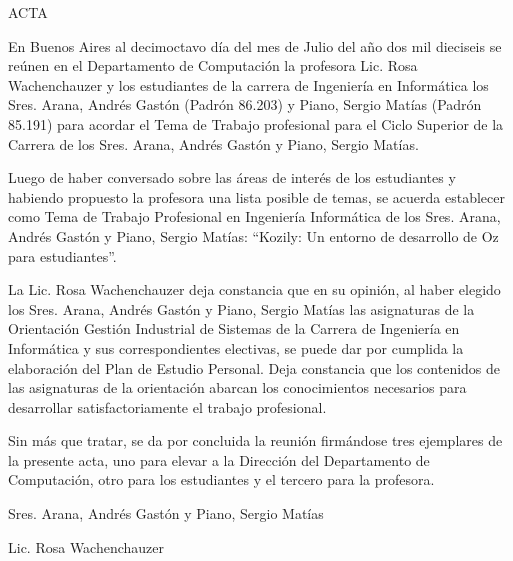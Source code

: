\documentclass[a4paper,11pt]{article}
\begin{document}
\begin{center}
ACTA
\end{center}

En Buenos Aires al decimoctavo día del mes de Julio del año dos mil dieciseis
se reúnen en el Departamento de Computación la profesora Lic. Rosa
Wachenchauzer y los estudiantes de la carrera de Ingeniería en Informática los
Sres. Arana, Andrés Gastón (Padrón 86.203) y Piano, Sergio Matías (Padrón
85.191) para acordar el Tema de Trabajo profesional para el Ciclo Superior de
la Carrera de los Sres. Arana, Andrés Gastón y Piano, Sergio Matías.

Luego de haber conversado sobre las áreas de interés de los estudiantes y
habiendo propuesto la profesora una lista posible de temas, se acuerda
establecer como Tema de Trabajo Profesional en Ingeniería Informática de los
Sres. Arana, Andrés Gastón y Piano, Sergio Matías: “Kozily: Un entorno de
desarrollo de Oz para estudiantes”.

La Lic. Rosa Wachenchauzer deja constancia que en su opinión, al haber elegido
los Sres. Arana, Andrés Gastón y Piano, Sergio Matías las asignaturas de la
Orientación Gestión Industrial de Sistemas de la Carrera de Ingeniería en
Informática y sus correspondientes electivas, se puede dar por cumplida la
elaboración del Plan de Estudio Personal. Deja constancia que los contenidos de
las asignaturas de la orientación abarcan los conocimientos necesarios para
desarrollar satisfactoriamente el trabajo profesional.

Sin más que tratar, se da por concluida la reunión firmándose tres ejemplares
de la presente acta, uno para elevar a la Dirección del Departamento de
Computación, otro para los estudiantes y el tercero para la profesora.

\setlength\parskip{10em}

\begin{flushright}
\parbox{14em}{Sres. Arana, Andrés Gastón y Piano, Sergio Matías}
\end{flushright}

\begin{flushright}
\parbox{14em}{Lic. Rosa Wachenchauzer}
\end{flushright}
\end{document}
